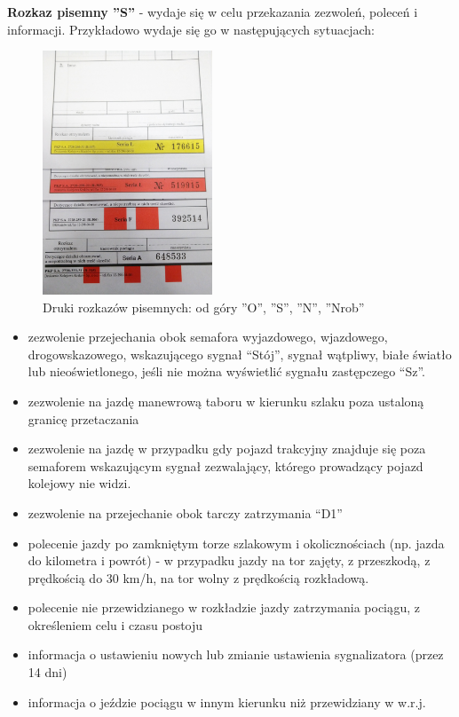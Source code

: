 \textbf{Rozkaz pisemny ''S''} - wydaje się w celu przekazania zezwoleń, poleceń i informacji. Przykładowo wydaje się go w
następujących sytuacjach:

	\begin{figure}
		\includegraphics[width=0.45\textwidth]{skryptkierownik-img/rozkazy-pisemne.jpg}
		\caption{Druki rozkazów pisemnych: od góry ''O'', ''S'', ''N'', ''Nrob''}
	\end{figure}
\begin{itemize}
\item zezwolenie przejechania obok semafora wyjazdowego, wjazdowego, drogowskazowego, wskazującego sygnał “Stój”, sygnał
wątpliwy, białe światło lub nieoświetlonego, jeśli nie można wyświetlić sygnału zastępczego “Sz”.
\item zezwolenie na jazdę manewrową taboru w kierunku szlaku poza ustaloną granicę przetaczania
\item zezwolenie na jazdę w przypadku gdy pojazd trakcyjny znajduje się poza semaforem wskazującym sygnał zezwalający,
którego prowadzący pojazd kolejowy nie widzi.
\item zezwolenie na przejechanie obok tarczy zatrzymania “D1”
\item polecenie jazdy po zamkniętym torze szlakowym i okolicznościach (np. jazda do kilometra i powrót) - w przypadku jazdy na tor zajęty, z przeszkodą, z prędkością do 30 km/h, na tor wolny z prędkością rozkładową.
\item polecenie nie przewidzianego w rozkładzie jazdy zatrzymania pociągu, z określeniem celu i czasu postoju
\item informacja o ustawieniu nowych lub zmianie ustawienia sygnalizatora (przez 14 dni)
\item informacja o jeździe pociągu w innym kierunku niż przewidziany w w.r.j.
\end{itemize}

